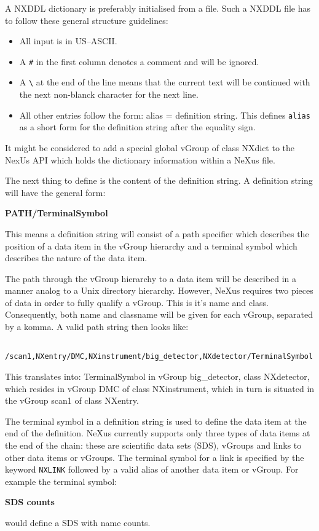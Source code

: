 \documentclass[12pt]{article}
\begin{document}
A NXDDL dictionary is preferably initialised from a file.
Such a NXDDL file has to follow these general structure guidelines:
\begin{itemize}
\item All input is in US--ASCII.
\item A \verb+#+ in the first column denotes a comment and will be ignored.
\item A \verb+\+ at the end of the line means that the current text will be 
 continued with the next non-blanck character for the next line.
\item All other entries follow the form: alias = definition string.
 This defines \verb+alias+ as a short form for the definition string  after the
 equality sign.
\end{itemize}         
It might be considered to add a special global vGroup of class NXdict to the
NexUs API which holds the dictionary information within a NeXus file.

 The next thing to define is the content of the definition string. A
 definition string will have the general form: \\
\centerline{\bf PATH/TerminalSymbol}
 This means a definition string will consist of a path specifier which
 describes the position of a data item in the vGroup hierarchy and a
 terminal symbol which describes the nature of the data item. 

 The path through the vGroup hierarchy to a data item will be described in a
 manner analog to a Unix directory hierarchy. However, NeXus requires two
 pieces of data in order to fully qualify a vGroup. This is it's name and
 class. Consequently, both name and classname will be given for each vGroup,
 separated by a komma. A valid path string then looks like: \\
\begin{verbatim} 
     /scan1,NXentry/DMC,NXinstrument/big_detector,NXdetector/TerminalSymbol
\end{verbatim}
 This translates into: TerminalSymbol in vGroup big\_detector, class
 NXdetector, which resides in vGroup DMC of class NXinstrument, which in
 turn is situated in the vGroup scan1 of class NXentry.

 The terminal symbol in a definition string is used to define the data item
 at the end of the definition. NeXus currently supports only three types of
 data items at the end of the chain: these are scientific data sets (SDS),
 vGroups and links to other data items or vGroups. The terminal symbol for a link
 is specified by the keyword \verb+NXLINK+  
 followed
 by a valid alias of another data item or vGroup. For example the terminal 
 symbol: \\
 \centerline{\bf SDS counts}
 would define a SDS with name counts.
\end{document}
